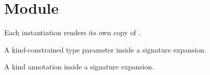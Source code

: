 \section{Module }\label{Oxcaml-M_param2}%
Each instantiation renders its own copy of .

\label{Oxcaml-M_param2--type-t}\begin{ocamlindent}A kind-constrained type parameter inside a signature expansion.\end{ocamlindent}%
\medbreak
\label{Oxcaml-M_param2--type-t_direct}\begin{ocamlindent}A kind annotation inside a signature expansion.\end{ocamlindent}%
\medbreak


